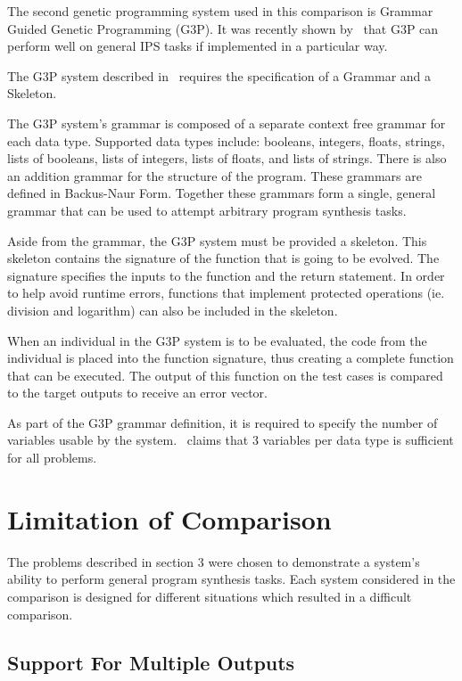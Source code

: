 The second genetic programming system used in this comparison is Grammar Guided Genetic Programming (G3P). It was recently shown by~\cite{Forstenlechner:2017:eurogp} that G3P can perform well on general IPS tasks if implemented in a particular way.

The G3P system described in~\cite{Forstenlechner:2017:eurogp} requires the specification of a Grammar and a Skeleton. 

The G3P system's grammar is composed of a separate context free grammar for each data type. Supported data types include: booleans, integers, floats, strings, lists of booleans, lists of integers, lists of floats, and lists of strings. There is also an addition grammar for the structure of the program.  These grammars are defined in Backus-Naur Form. Together these grammars form a single, general grammar that can be used to attempt arbitrary program synthesis tasks.

Aside from the grammar, the G3P system must be provided a skeleton. This skeleton contains the signature of the function that is going to be evolved. The signature specifies the inputs to the function and the return statement. In order to help avoid runtime errors, functions that implement protected operations (ie. division and logarithm) can also be included in the skeleton.

When an individual in the G3P system is to be evaluated, the code from the individual is placed into the function signature, thus creating a complete function that can be executed. The output of this function on the test cases is compared to the target outputs to receive an error vector.

As part of the G3P grammar definition, it is required to specify the number of variables usable by the system.~\cite{Forstenlechner:2017:eurogp} claims that 3 variables per data type is sufficient for all problems.

\section{Limitation of Comparison}

The problems described in section 3 were chosen to demonstrate a system's ability to perform general program synthesis tasks. Each system considered in the comparison is designed for different situations which resulted in a difficult comparison.

\subsection{Support For Multiple Outputs}

